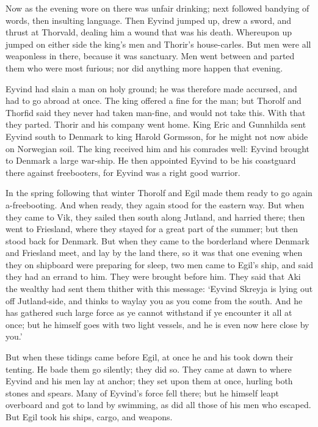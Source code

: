 Now as the evening wore on there was unfair drinking; next followed bandying of words, then insulting language. Then Eyvind jumped up, drew a sword, and thrust at Thorvald, dealing him a wound that was his death. Whereupon up jumped on either side the king's men and Thorir's house-carles. But men were all weaponless in there, because it was sanctuary. Men went between and parted them who were most furious; nor did anything more happen that evening.

Eyvind had slain a man on holy ground; he was therefore made accursed, and had to go abroad at once. The king offered a fine for the man; but Thorolf and Thorfid said they never had taken man-fine, and would not take this. With that they parted. Thorir and his company went home. King Eric and Gunnhilda sent Eyvind south to Denmark to king Harold Gormsson, for he might not now abide on Norwegian soil. The king received him and his comrades well: Eyvind brought to Denmark a large war-ship. He then appointed Eyvind to be his coastguard there against freebooters, for Eyvind was a right good warrior.

In the spring following that winter Thorolf and Egil made them ready to go again a-freebooting. And when ready, they again stood for the eastern way. But when they came to Vik, they sailed then south along Jutland, and harried there; then went to Friesland, where they stayed for a great part of the summer; but then stood back for Denmark. But when they came to the borderland where Denmark and Friesland meet, and lay by the land there, so it was that one evening when they on shipboard were preparing for sleep, two men came to Egil's ship, and said they had an errand to him. They were brought before him. They said that Aki the wealthy had sent them thither with this message: `Eyvind Skreyja is lying out off Jutland-side, and thinks to waylay you as you come from the south. And he has gathered such large force as ye cannot withstand if ye encounter it all at once; but he himself goes with two light vessels, and he is even now here close by you.'

But when these tidings came before Egil, at once he and his took down their tenting. He bade them go silently; they did so. They came at dawn to where Eyvind and his men lay at anchor; they set upon them at once, hurling both stones and spears. Many of Eyvind's force fell there; but he himself leapt overboard and got to land by swimming, as did all those of his men who escaped. But Egil took his ships, cargo, and weapons.

